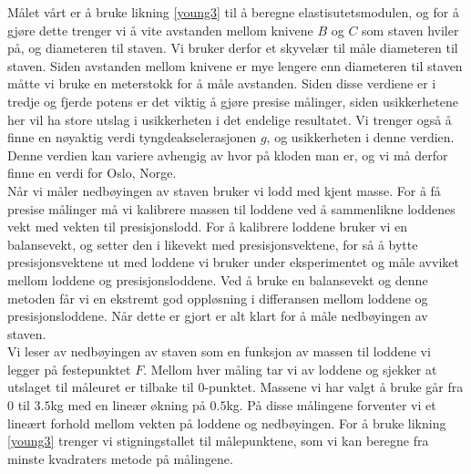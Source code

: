 \documentclass[%
 reprint,
 amsmath,amssymb,
 aps,
 norsk,
 booktabs
]{revtex4-1}
\begin{document}
Målet vårt er å bruke likning \eqref{young3} til å beregne elastisutetsmodulen, og for å gjøre dette trenger vi å vite avstanden mellom knivene $B$ og $C$ som staven hviler på, og diameteren til staven. Vi bruker derfor et skyvelær til måle diameteren til staven. Siden avstanden mellom knivene er mye lengere enn diameteren til staven måtte vi bruke en meterstokk for å måle avstanden. Siden disse verdiene er i tredje og fjerde potens er det viktig å gjøre presise målinger, siden usikkerhetene her vil ha store utslag i usikkerheten i det endelige resultatet. Vi trenger også å finne en nøyaktig verdi tyngdeakselerasjonen $g$, og usikkerheten i denne verdien. Denne verdien kan variere avhengig av hvor på kloden man er, og vi må derfor finne en verdi for Oslo, Norge. \\
Når vi måler nedbøyingen av staven bruker vi lodd med kjent masse. For å få presise målinger må vi kalibrere massen til loddene ved å sammenlikne loddenes vekt med vekten til presisjonslodd. For å kalibrere loddene bruker vi en balansevekt, og setter den i likevekt med presisjonsvektene, for så å bytte presisjonsvektene ut med loddene vi bruker under eksperimentet og måle avviket mellom loddene og presisjonsloddene. Ved å bruke en balansevekt og denne metoden får vi en ekstremt god oppløsning i differansen mellom loddene og presisjonsloddene. Når dette er gjort er alt klart for å måle nedbøyingen av staven.\\
Vi leser av nedbøyingen av staven som en funksjon av massen til loddene vi legger på festepunktet $F$. Mellom hver måling tar vi av loddene og sjekker at utslaget til måleuret er tilbake til $0$-punktet. Massene vi har valgt å bruke går fra $0$ til $3.5$kg med en lineær økning på $0.5$kg. På disse målingene forventer vi et lineært forhold mellom vekten på loddene og nedbøyingen. For å bruke likning \eqref{young3} trenger vi stigningstallet til målepunktene, som vi kan beregne fra minste kvadraters metode på målingene. \\
\end{document}
